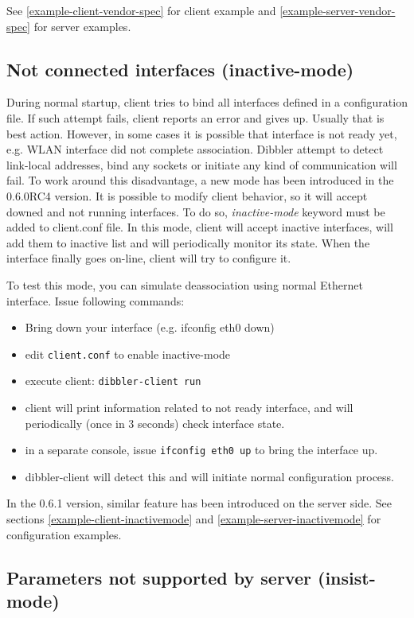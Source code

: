 See \ref{example-client-vendor-spec} for client example and
\ref{example-server-vendor-spec} for server examples.

\subsection{Not connected interfaces (inactive-mode)}
\label{feature-inactive-mode}
During normal startup, client tries to bind all interfaces defined in
a configuration file. If such attempt fails, client reports an error
and gives up. Usually that is best action. However, in some cases it
is possible that interface is not ready yet, e.g. WLAN interface did
not complete association. Dibbler attempt to detect link-local
addresses, bind any sockets or initiate any kind of communication will
fail. To work around this disadvantage, a new mode has been
introduced in the 0.6.0RC4 version. It is possible to modify client
behavior, so it will accept downed and not running interfaces. To do
so, \emph{inactive-mode} keyword must be added to client.conf file. In
this mode, client will accept inactive interfaces, will add them to
inactive list and will periodically monitor its state. When the
interface finally goes on-line, client will try to configure it.

To test this mode, you can simulate deassociation using normal
Ethernet interface. Issue following commands:

\begin{itemize}
\item Bring down your interface (e.g. ifconfig eth0 down)
\item edit \verb+client.conf+ to enable inactive-mode
\item execute client: \verb+dibbler-client run+
\item client will print information related to not ready interface,
  and will periodically (once in 3 seconds) check interface state.
\item in a separate console, issue \verb+ifconfig eth0 up+ to bring
  the interface up.
\item dibbler-client will detect this and will initiate normal
  configuration process.
\end{itemize}

In the 0.6.1 version, similar feature has been introduced on the
server side. See sections \ref{example-client-inactivemode} and
\ref{example-server-inactivemode} for configuration examples.

\subsection{Parameters not supported by server (insist-mode)}
\label{feature-insist-mode}

